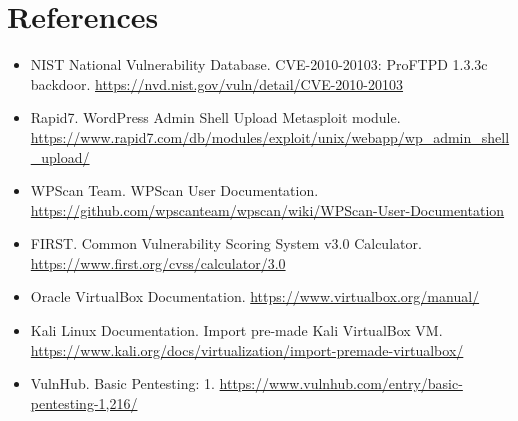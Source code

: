 \documentclass[11pt,a4paper]{article}
\begin{document}
\newpage
\section*{References}
\begin{itemize}
  \item NIST National Vulnerability Database. CVE-2010-20103: ProFTPD 1.3.3c backdoor. \url{https://nvd.nist.gov/vuln/detail/CVE-2010-20103}
  \item Rapid7. WordPress Admin Shell Upload Metasploit module. \url{https://www.rapid7.com/db/modules/exploit/unix/webapp/wp_admin_shell_upload/}
  \item WPScan Team. WPScan User Documentation. \url{https://github.com/wpscanteam/wpscan/wiki/WPScan-User-Documentation}
  \item FIRST. Common Vulnerability Scoring System v3.0 Calculator. \url{https://www.first.org/cvss/calculator/3.0}
  \item Oracle VirtualBox Documentation. \url{https://www.virtualbox.org/manual/}
  \item Kali Linux Documentation. Import pre-made Kali VirtualBox VM. \url{https://www.kali.org/docs/virtualization/import-premade-virtualbox/}
  \item VulnHub. Basic Pentesting: 1. \url{https://www.vulnhub.com/entry/basic-pentesting-1,216/}
\end{itemize}
\end{document}
